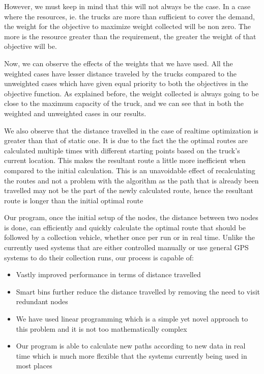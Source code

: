 \documentclass[12pt]{article}
\begin{document}
However, we must keep in mind that this will not always be the case. In a case where the resources, ie. the trucks are more than sufficient to cover the demand, the weight for the objective to maximize weight collected will be non zero. The more is the resource greater than the requirement, the greater the weight of that objective will be.

Now, we can observe the effects of the weights that we have used. All the weighted cases have lesser distance traveled by the trucks compared to the unweighted cases which have given equal priority to both the objectives in the objective function. As explained before, the weight collected is always going to be close to the maximum capacity of the truck, and we can see that in both the weighted and unweighted cases in our results.

We also observe that the distance travelled in the case of realtime optimization is greater than that of static one. It is due to the fact the the optimal routes are calculated multiple times with different starting points based on the truck's current location. This makes the resultant route a little more inefficient when compared to the initial calculation. This is an unavoidable effect of recalculating the routes and not a problem with the algorithm as the path that is already been travelled may not be the part of the newly calculated route, hence the resultant route is longer than the initial optimal route

Our program, once the initial setup of the nodes, the distance between two nodes is done, can efficiently and quickly calculate the optimal route that should be followed by a collection vehicle, whether once per run or in real time. Unlike the currently used systems that are either controlled manually or use general GPS systems to do their collection runs, our process is capable of:
\begin{itemize}
    \item Vastly improved performance in terms of distance travelled
    \item Smart bins further reduce the distance travelled by removing the need to visit redundant nodes
    \item We have used linear programming which is a simple yet novel approach to this problem and it is not too mathematically complex
    \item Our program is able to calculate new paths according to new data in real time which is much more flexible that the systems currently being used in most places
\end{itemize}
\end{document}
